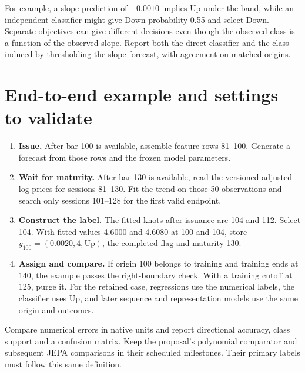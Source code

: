 \documentclass[10pt,letterpaper]{article}
\begin{document}
For example, a slope prediction of \(+0.0010\) implies Up under the band, while an independent classifier might give Down probability 0.55 and select Down. Separate objectives can give different decisions even though the observed class is a function of the observed slope. Report both the direct classifier and the class induced by thresholding the slope forecast, with agreement on matched origins.\par

\clearpage

\section{End-to-end example and settings to validate}

\begin{enumerate}

\item \textbf{Issue.} After bar 100 is available, assemble feature rows 81--100. Generate a forecast from those rows and the frozen model parameters.

\item \textbf{Wait for maturity.} After bar 130 is available, read the versioned adjusted log prices for sessions 81--130. Fit the trend on those 50 observations and search only sessions 101--128 for the first valid endpoint.

\item \textbf{Construct the label.} The fitted knots after issuance are 104 and 112. Select 104. With fitted values 4.6000 and 4.6080 at 100 and 104, store \(y_{100}=(0.0020,4,\text{Up})\), the completed flag and maturity 130.

\item \textbf{Assign and compare.} If origin 100 belongs to training and training ends at 140, the example passes the right-boundary check. With a training cutoff at 125, purge it. For the retained case, regressions use the numerical labels, the classifier uses Up, and later sequence and representation models use the same origin and outcomes.

\end{enumerate}

Compare numerical errors in native units and report directional accuracy, class support and a confusion matrix. Keep the proposal's polynomial comparator and subsequent JEPA comparisons in their scheduled milestones. Their primary labels must follow this same definition.\par
\end{document}
